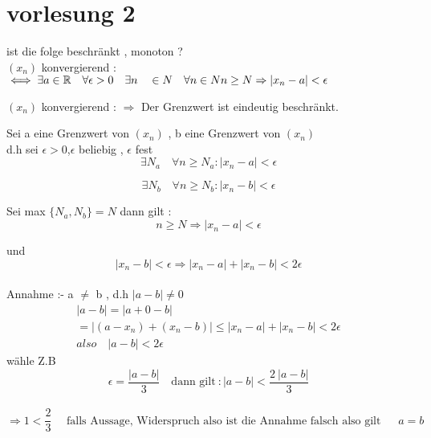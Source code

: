 \section{vorlesung 2}
\begin{text}
	ist die folge beschränkt , monoton ?\\
	
	$(x_n)$ konvergierend : $\iff \exists a \in\mathbb{R} \quad \forall \epsilon > 0 \quad \exists n \quad \in N \quad \forall n \in N \quad \\
	n \geq N \Rightarrow |x_n - a |< \epsilon $
\end{text}


\begin{theorem}
	
	$(x_n)$ konvergierend : $\Rightarrow$ Der Grenzwert ist eindeutig beschränkt.
	
\end{theorem}



\begin{beweis}
	Sei a eine Grenzwert von $(x_n)$ , b eine Grenzwert von $(x_n)$ \\
	d.h sei $\epsilon > 0$,$\epsilon$ beliebig , $\epsilon$ fest \\
	
	
	\begin{equation}
	\exists  N_a \quad \forall n \geq N_a : |x_n-a|< \epsilon
	\end{equation}
	
	
	\begin{equation}
	\exists  N_b \quad \forall n \geq N_b : |x_n-b|< \epsilon
	\end{equation}
	
	Sei max $\{N_a,N_b\}=N$
	dann gilt : \\
	\begin{equation}
	n \geq N \Rightarrow |x_n - a| < \epsilon
	\end{equation}
	
	und \begin{equation}
	|x_n -b| < \epsilon \Rightarrow |x_n -a|+|x_n - b|< 2\epsilon
	\end{equation}\\
	Annahme :- a $\neq$ b , d.h $|a-b|\neq 0 $
	\begin{gather*}
	|a-b|=|a+0-b|\\
	=|(a-x_n)+(x_n-b)| \leq |x_n - a|+|x_n-b|< 2 \epsilon \\
	also \quad |a - b|< 2 \epsilon
	\end{gather*}
	wähle Z.B  \[\epsilon = \frac{|a-b|}{3}
	\quad
	\text{dann gilt}\ :|a-b|< \frac{2 \ |a-b|}{3}\]\\
	
	\[ \Rightarrow 1 < \frac{2}{3} \quad  \text{ falls  Aussage, Widerspruch  also  ist  die  Annahme  falsch  also  gilt }\ \quad a=b\]
\end{beweis}
\newpage


